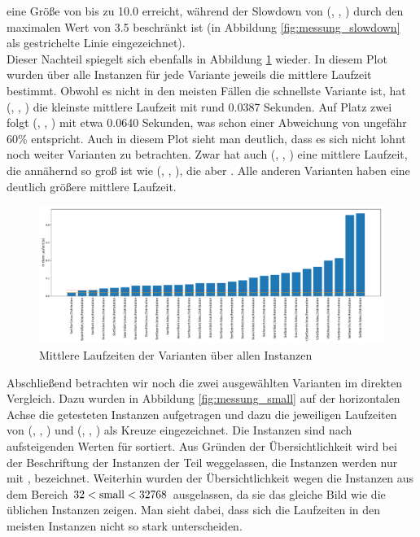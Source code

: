 eine Größe von bis zu 10.0 erreicht, während der Slowdown von  (\SorSor, \true, \distr) durch den maximalen
Wert von 3.5 beschränkt ist (in Abbildung \ref{fig:messung_slowdown} als gestrichelte Linie eingezeichnet).
\\
Dieser Nachteil spiegelt sich ebenfalls in Abbildung \ref{fig:messung_mean} wieder. In diesem Plot
wurden über alle Instanzen für jede Variante jeweils die mittlere Laufzeit bestimmt. Obwohl
es nicht in den meisten Fällen die schnellste Variante ist, hat (\SorSor, \true, \distr) die 
kleinste mittlere Laufzeit mit rund 0.0387 Sekunden. Auf Platz zwei folgt
(\SeaUSet, \false, \perm) mit etwa 0.0640 Sekunden, was schon einer Abweichung von ungefähr 60\% entspricht.
Auch in diesem Plot sieht man deutlich, dass es sich nicht lohnt noch weiter Varianten zu betrachten. Zwar hat 
auch (\SorSor, \true, \perm) eine mittlere Laufzeit, die annähernd so groß ist wie (\SeaUSet, \false, \perm),{}
die aber . Alle anderen Varianten haben eine deutlich größere mittlere
Laufzeit.
\begin{figure}
\centering
	\includegraphics[width = \textwidth]{figures/mean.pdf}
	\caption{Mittlere Laufzeiten der Varianten über allen Instanzen}
	\label{fig:messung_mean}
\end{figure}
Abschließend betrachten wir noch die zwei ausgewählten Varianten im direkten Vergleich. Dazu wurden
in Abbildung \ref{fig:messung_small} auf der horizontalen Achse die getesteten Instanzen aufgetragen
und dazu die jeweiligen Laufzeiten von (\SorSor, \true, \distr) und (\SeaUSet, \false, \perm) als Kreuze
eingezeichnet. Die Instanzen sind nach aufsteigenden Werten für \sm{} sortiert. Aus Gründen der Übersichtlichkeit
wird bei  der Beschriftung der Instanzen der Teil \fr{} weggelassen, die Instanzen werden 
nur mit \la{}, \sm{} bezeichnet. Weiterhin wurden der
Übersichtlichkeit wegen die Instanzen aus dem Bereich $32 < \text{small}  <32768$ ausgelassen, da sie das gleiche
Bild wie die üblichen Instanzen zeigen.
Man sieht dabei, dass sich die Laufzeiten in den meisten Instanzen nicht so stark unterscheiden.

